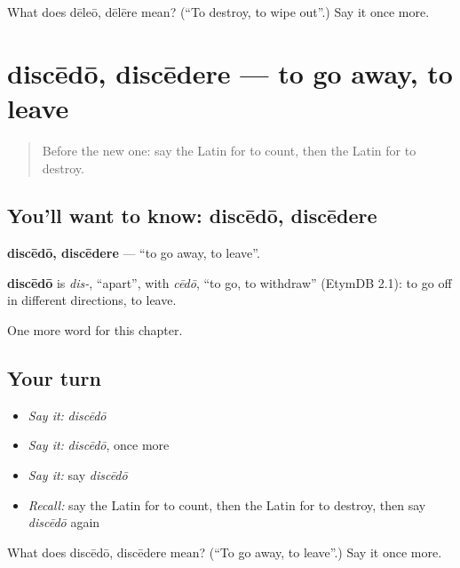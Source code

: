 \begin{tcolorbox}[breakable,colback=teal!4,colframe=teal!35!black,title={Before you move on}]
What does dēleō, dēlēre mean? (\textquotedblleft{}To destroy, to wipe out\textquotedblright{}.) Say it once more.
\end{tcolorbox}
\section[discēdō, discēdere]{discēdō, discēdere — to go away, to leave}

\label{lesson:LA-C160-discedo}



\begin{quote}
Before the new one: say the Latin for to count, then the Latin for to destroy.
\end{quote}

\subsection*{You'll want to know: discēdō, discēdere}
\textbf{discēdō, discēdere} — \textquotedblleft{}to go away, to leave\textquotedblright{}.

\begin{cousinweb}
\textbf{discēdō} is \emph{dis-}, \textquotedblleft{}apart\textquotedblright{}, with \emph{cēdō}, \textquotedblleft{}to go, to withdraw\textquotedblright{} (EtymDB 2.1): to go off in different directions, to leave.
\end{cousinweb}

\begin{grammarlens}[title={What you've built}]
One more word for this chapter.
\end{grammarlens}

\subsection*{Your turn}
\begin{itemize}
\raggedright
  \item \emph{Say it:} \emph{discēdō}
  \item \emph{Say it:} \emph{discēdō}, once more
  \item \emph{Say it:} say \emph{discēdō}
  \item \emph{Recall:} say the Latin for to count, then the Latin for to destroy, then say \emph{discēdō} again
\end{itemize}

\begin{tcolorbox}[breakable,colback=teal!4,colframe=teal!35!black,title={Before you move on}]
What does discēdō, discēdere mean? (\textquotedblleft{}To go away, to leave\textquotedblright{}.) Say it once more.
\end{tcolorbox}
